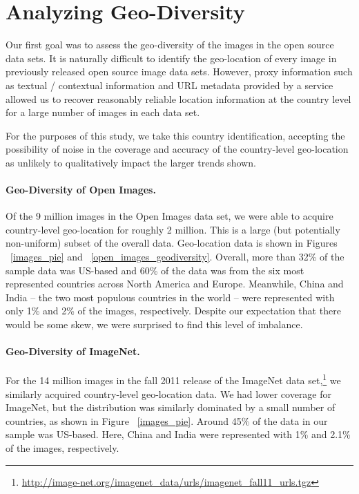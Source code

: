 \documentclass{article}
\begin{document}
\section{Analyzing Geo-Diversity}
\label{inferred_location}

Our first goal was to assess the geo-diversity of the images in the open source
data sets.
It is naturally difficult to identify the geo-location
of every image in previously released open source image data sets.
However, proxy information
such as textual / contextual information and URL metadata provided by a service
allowed us to recover reasonably reliable
location information at the country level for a
large number of images in each data set.

For the purposes of this study, we take this country
identification, accepting the possibility of noise in the coverage and accuracy of the country-level
geo-location as unlikely to qualitatively impact the larger trends shown.


\paragraph{Geo-Diversity of Open Images.}
Of the 9 million images in the Open Images data set, we were able to
acquire country-level geo-location for roughly 2 million.  This is a large
(but potentially non-uniform) subset of the overall data.  Geo-location
data is shown in Figures ~\ref{images_pie} and ~\ref{open_images_geodiversity}.  Overall,
more than 32\% of the sample data was US-based and 60\% of the data
was from the six most represented countries across North America and Europe.
Meanwhile, China and India -- the two most populous countries in the world --
were represented with only 1\% and 2\% of the images, respectively.
Despite our expectation that there would be some skew, we were surprised
to find this level of imbalance.

\paragraph{Geo-Diversity of ImageNet.}
For the 14 million images in the fall 2011 release of the ImageNet data set,\footnote{\url{http://image-net.org/imagenet_data/urls/imagenet_fall11_urls.tgz}} we
similarly acquired country-level geo-location data. We had lower coverage for ImageNet,
but the distribution was similarly dominated by a small number of countries, as shown in Figure ~\ref{images_pie}.
Around 45\% of the data in our sample was US-based.
Here, China and India were represented with 1\% and 2.1\% of the images, respectively.
\end{document}
